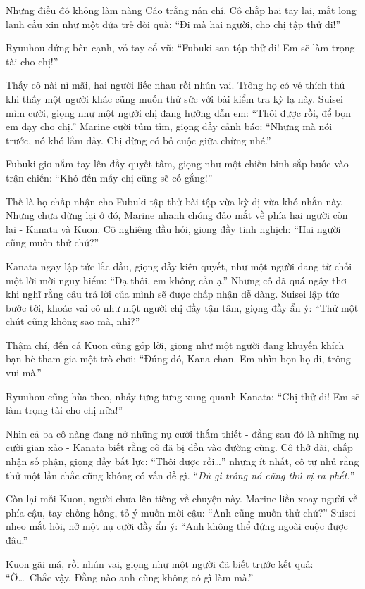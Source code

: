 \documentclass[../main.tex]{subfiles}
\begin{document}
Nhưng điều đó không làm nàng Cáo trắng nản chí. Cô chắp hai tay lại, mắt long lanh cầu xin như một đứa trẻ đòi quà: ``Đi mà hai người, cho chị tập thử đi!''

Ryuuhou đứng bên cạnh, vỗ tay cổ vũ: ``Fubuki-san tập thử đi! Em sẽ làm trọng tài cho chị!''

Thấy cô nài nỉ mãi, hai người liếc nhau rồi nhún vai. Trông họ có vẻ thích thú khi thấy một người khác cũng muốn thử sức với bài kiểm tra kỳ lạ này. Suisei mỉm cười, giọng như một người chị đang hướng dẫn em: ``Thôi được rồi, để bọn em dạy cho chị.'' Marine cười tủm tỉm, giọng đầy cảnh báo: ``Nhưng mà nói trước, nó khó lắm đấy. Chị đừng có bỏ cuộc giữa chừng nhé.''

Fubuki giơ nắm tay lên đầy quyết tâm, giọng như một chiến binh sắp bước vào trận chiến: ``Khó đến mấy chị cũng sẽ cố gắng!''

Thế là họ chấp nhận cho Fubuki tập thử bài tập vừa kỳ dị vừa khó nhằn này. Nhưng chưa dừng lại ở đó, Marine nhanh chóng đảo mắt về phía hai người còn lại - Kanata và Kuon. Cô nghiêng đầu hỏi, giọng đầy tinh nghịch: ``Hai người cũng muốn thử chứ?''

Kanata ngay lập tức lắc đầu, giọng đầy kiên quyết, như một người đang từ chối một lời mời nguy hiểm: ``Dạ thôi, em không cần ạ.'' Nhưng cô đã quá ngây thơ khi nghĩ rằng câu trả lời của mình sẽ được chấp nhận dễ dàng. Suisei lập tức bước tới, khoác vai cô như một người chị đầy tận tâm, giọng đầy ẩn ý: ``Thử một chút cũng không sao mà, nhỉ?''

Thậm chí, đến cả Kuon cũng góp lời, giọng như một người đang khuyến khích bạn bè tham gia một trò chơi: ``Đúng đó, Kana-chan. Em nhìn bọn họ đi, trông vui mà.''

Ryuuhou cũng hùa theo, nhảy tưng tưng xung quanh Kanata: ``Chị thử đi! Em sẽ làm trọng tài cho chị nữa!''

Nhìn cả ba cô nàng đang nở những nụ cười thắm thiết - đằng sau đó là những nụ cười gian xảo - Kanata biết rằng cô đã bị dồn vào đường cùng. Cô thở dài, chấp nhận số phận, giọng đầy bất lực: ``Thôi được rồi\dots'' nhưng ít nhất, cô tự nhủ rằng thử một lần chắc cũng không có vấn đề gì. ``\textit{Dù gì trông nó cũng thú vị ra phết.}''

Còn lại mỗi Kuon, người chưa lên tiếng về chuyện này. Marine liền xoay người về phía cậu, tay chống hông, tỏ ý muốn mời cậu: ``Anh cũng muốn thử chứ?'' Suisei nheo mắt hỏi, nở một nụ cười đầy ẩn ý: ``Anh không thể đứng ngoài cuộc được đâu.''

Kuon gãi má, rồi nhún vai, giọng như một người đã biết trước kết quả: ``Ờ\dots\ Chắc vậy. Đằng nào anh cũng không có gì làm mà.''
\end{document}
